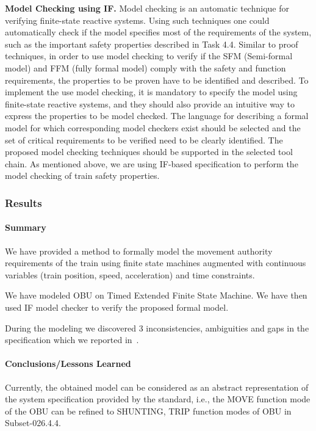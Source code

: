 \documentclass{template/openetcs_article}
\begin{document}
\textbf{Model Checking using IF.}
Model checking is an automatic technique for verifying finite-state reactive
systems. Using such techniques one could automatically check if the model
specifies most of the requirements of the system, such as the important safety
properties described in Task 4.4. Similar to proof techniques, in order to use
model checking to verify if the SFM (Semi-formal model) and FFM (fully formal
model) comply with the safety and function requirements,
the properties to be proven have to be identified and described. To implement
the use model checking, it is mandatory to specify the model using finite-state
reactive systems, and they should also provide an intuitive way to express the
properties to be model checked. The language for describing a formal model for
which corresponding model checkers exist should be selected and the set of
critical requirements to be verified need to be clearly identified. The proposed
model checking techniques should be supported in the selected tool chain. As
mentioned above, we are using IF-based specification to perform
the model checking of train safety properties.


\subsubsection{Results}



\paragraph{Summary}

We have provided a method to formally model the
movement authority requirements of the train using
finite state machines augmented with continuous variables (train position, speed, acceleration) and
time constraints. 

We have modeled OBU on Timed Extended Finite State Machine.
We have then used IF model checker to verify the
proposed formal model. 

During the modeling we discovered 3 inconsistencies, ambiguities and gaps in the specification
which we reported in~\cite{specfindingsTSP}.

\paragraph{Conclusions/Lessons Learned}

Currently, the obtained model can be considered as an abstract representation
of the system specification provided by the standard, i.e., the MOVE
function mode of the OBU can be refined to SHUNTING, TRIP function modes of
OBU in Subset-026.4.4.
\end{document}
